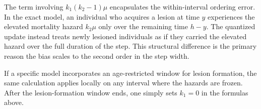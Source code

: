 \documentclass{article}
\begin{document}
The term involving \(k_1(k_2-1)\mu\) encapsulates the within-interval ordering error. In the exact model, an individual who acquires a lesion at time \(y\) experiences the elevated mortality hazard \(k_2\mu\) only over the remaining time \(h-y\). The quantized update instead treats newly lesioned individuals as if they carried the elevated hazard over the full duration of the step. This structural difference is the primary reason the bias scales to the second order in the step width. 

If a specific model incorporates an age-restricted window for lesion formation, the same calculation applies locally on any interval where the hazards are frozen. After the lesion-formation window ends, one simply sets \(k_1=0\) in the formulas above.
\end{document}
